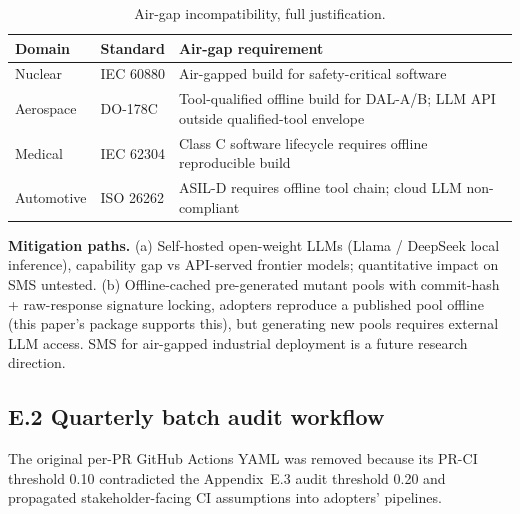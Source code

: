 \documentclass[acmsmall,screen,review]{acmart}
\begin{document}
{\def\LTcaptype{table} %
\begin{longtable}[]{@{}
  >{\raggedright\arraybackslash}p{}
  >{\raggedright\arraybackslash}p{}
  >{\raggedright\arraybackslash}p{}@{}}
\caption{Air-gap incompatibility, full justification.}\label{tab:p2-25}\\
\toprule\noalign{}
\begin{minipage}[b]{\linewidth}\raggedright
Domain
\end{minipage} & \begin{minipage}[b]{\linewidth}\raggedright
Standard
\end{minipage} & \begin{minipage}[b]{\linewidth}\raggedright
Air-gap requirement
\end{minipage} \\
\midrule\noalign{}
\endfirsthead
\endhead
\bottomrule\noalign{}
\endlastfoot
Nuclear & IEC 60880 & Air-gapped build for safety-critical software \\
Aerospace & DO-178C & Tool-qualified offline build for DAL-A/B; LLM API
outside qualified-tool envelope \\
Medical & IEC 62304 & Class C software lifecycle requires offline
reproducible build \\
Automotive & ISO 26262 & ASIL-D requires offline tool chain; cloud LLM
non-compliant \\
\end{longtable}
}

\textbf{Mitigation paths.} (a) Self-hosted open-weight LLMs (Llama
/ DeepSeek local inference), capability gap vs API-served frontier
models; quantitative impact on SMS untested. (b) Offline-cached
pre-generated mutant pools with commit-hash + raw-response signature
locking, adopters reproduce a published pool offline (this paper's
package supports this), but generating new pools requires external LLM
access. SMS for air-gapped industrial deployment is a future research
direction.

\subsection{E.2 Quarterly batch audit workflow}\label{e.2-quarterly-batch-audit-workflow}

The original per-PR GitHub Actions YAML was removed because its PR-CI
threshold 0.10 contradicted the Appendix~E.3 audit threshold 0.20 and propagated
stakeholder-facing CI assumptions into adopters' pipelines.
\end{document}
